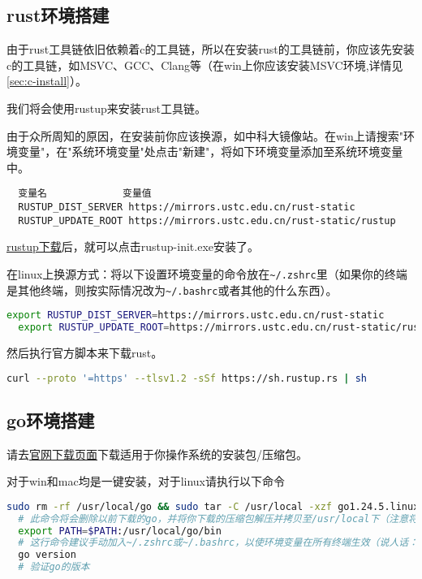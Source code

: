 \documentclass[../main.tex]{subfiles}
\begin{document}
\subsection{rust环境搭建}

由于rust工具链依旧依赖着c的工具链，所以在安装rust的工具链前，你应该先安装c的工具链，如MSVC、GCC、Clang等（在win上你应该安装MSVC环境,详情见\ref{sec:c-install}）。

我们将会使用rustup来安装rust工具链。

由于众所周知的原因，在安装前你应该换源，如中科大镜像站。在win上请搜索"环境变量"，在"系统环境变量"处点击"新建"，将如下环境变量添加至系统环境变量中。

\begin{lstlisting}
  变量名             变量值
  RUSTUP_DIST_SERVER https://mirrors.ustc.edu.cn/rust-static
  RUSTUP_UPDATE_ROOT https://mirrors.ustc.edu.cn/rust-static/rustup
\end{lstlisting}

\href{https://rustup.rs}{rustup下载}后，就可以点击rustup-init.exe安装了。

在linux上换源方式：将以下设置环境变量的命令放在\texttt{\textasciitilde/.zshrc}里（如果你的终端是其他终端，则按实际情况改为\texttt{\textasciitilde/.bashrc}或者其他的什么东西）。

\begin{lstlisting}[language=bash]
  export RUSTUP_DIST_SERVER=https://mirrors.ustc.edu.cn/rust-static
  export RUSTUP_UPDATE_ROOT=https://mirrors.ustc.edu.cn/rust-static/rustup
\end{lstlisting}

然后执行官方脚本来下载rust。

\begin{lstlisting}[language=bash]
  curl --proto '=https' --tlsv1.2 -sSf https://sh.rustup.rs | sh
\end{lstlisting}

\subsection{go环境搭建}

请去\href{https://go.dev/doc/install}{官网下载页面}下载适用于你操作系统的安装包/压缩包。

对于win和mac均是一键安装，对于linux请执行以下命令

\begin{lstlisting}[language=bash]
  sudo rm -rf /usr/local/go && sudo tar -C /usr/local -xzf go1.24.5.linux-amd64.tar.gz
  # 此命令将会删除以前下载的go，并将你下载的压缩包解压并拷贝至/usr/local下（注意将其替换为压缩包的真实路径）
  export PATH=$PATH:/usr/local/go/bin
  # 这行命令建议手动加入~/.zshrc或~/.bashrc，以使环境变量在所有终端生效（说人话：让终端能找到你的go在哪）
  go version
  # 验证go的版本
\end{lstlisting}
\end{document}

